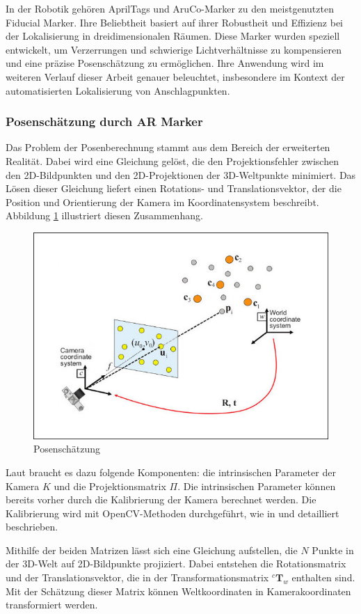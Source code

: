 In der Robotik gehören AprilTags und AruCo-Marker zu den meistgenutzten Fiducial Marker. 
Ihre Beliebtheit basiert auf ihrer Robustheit und Effizienz bei der Lokalisierung in 
dreidimensionalen Räumen. Diese Marker wurden speziell entwickelt, um Verzerrungen und 
schwierige Lichtverhältnisse zu kompensieren und eine präzise Posenschätzung zu ermöglichen. 
Ihre Anwendung wird im weiteren Verlauf dieser Arbeit genauer beleuchtet, insbesondere im 
Kontext der automatisierten Lokalisierung von Anschlagpunkten.

\clearpage
\subsubsection{Posenschätzung durch AR Marker}
Das Problem der Posenberechnung stammt aus dem Bereich der erweiterten 
Realität. Dabei wird eine Gleichung gelöst, die den Projektionsfehler 
zwischen den 2D-Bildpunkten und den 2D-Projektionen der 3D-Weltpunkte minimiert. 
Das Lösen dieser Gleichung liefert einen Rotations- und Translationsvektor, der 
die Position und Orientierung der Kamera im Koordinatensystem beschreibt. 
Abbildung \ref{fig:pose} illustriert diesen Zusammenhang.

\begin{figure}[H]
    \centering
    \includegraphics[width=0.4\linewidth]{graphics/pose.png}
    \caption{Posenschätzung}
    \label{fig:pose}
\end{figure}

Laut \cite{pose} braucht es dazu folgende Komponenten: die intrinsischen Parameter 
der Kamera \( K \) und die Projektionsmatrix \( \Pi \). Die intrinsischen Parameter 
können bereits vorher durch die Kalibrierung der Kamera berechnet werden. Die Kalibrierung 
wird mit OpenCV-Methoden durchgeführt, wie in \cite{zhang} und \cite{bradski} detailliert 
beschrieben.

Mithilfe der beiden Matrizen lässt sich eine Gleichung aufstellen, die \( N \) Punkte 
in der 3D-Welt auf 2D-Bildpunkte projiziert. Dabei entstehen die Rotationsmatrix und der 
Translationsvektor, die in der Transformationsmatrix \({}^{c}\mathbf{T}_{w}\) enthalten sind.
Mit der Schätzung dieser Matrix können Weltkoordinaten in Kamerakoordinaten transformiert 
werden.


